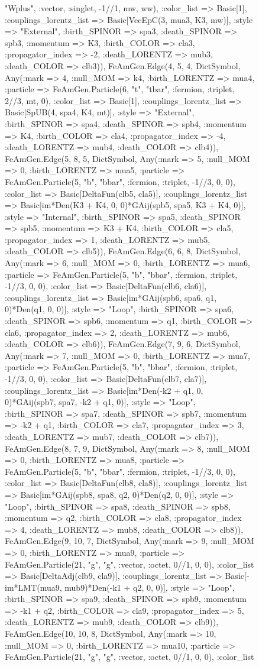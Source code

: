 \documentclass{revtex4}
\begin{document}
\begin{figure}[!htb]
\begin{center}
{"Wplus", :vector, :singlet, -1//1, mw, ww), :color_list => Basic[1], :couplings_lorentz_list => Basic[VecEpC(3, mua3, K3, mw)], :style => "External", :birth_SPINOR => spa3, :death_SPINOR => spb3, :momentum => K3, :birth_COLOR => cla3, :propagator_index => -2, :death_LORENTZ => mub3, :death_COLOR => clb3)), FeAmGen.Edge(4, 5, 4, Dict{Symbol, Any}(:mark => 4, :null_MOM => k4, :birth_LORENTZ => mua4, :particle => FeAmGen.Particle(6, "t", "tbar", :fermion, :triplet, 2//3, mt, 0), :color_list => Basic[1], :couplings_lorentz_list => Basic[SpUB(4, spa4, K4, mt)], :style => "External", :birth_SPINOR => spa4, :death_SPINOR => spb4, :momentum => K4, :birth_COLOR => cla4, :propagator_index => -4, :death_LORENTZ => mub4, :death_COLOR => clb4)), FeAmGen.Edge(5, 8, 5, Dict{Symbol, Any}(:mark => 5, :null_MOM => 0, :birth_LORENTZ => mua5, :particle => FeAmGen.Particle(5, "b", "bbar", :fermion, :triplet, -1//3, 0, 0), :color_list => Basic[DeltaFun(clb5, cla5)], :couplings_lorentz_list => Basic[im*Den(K3 + K4, 0, 0)*GAij(spb5, spa5, K3 + K4, 0)], :style => "Internal", :birth_SPINOR => spa5, :death_SPINOR => spb5, :momentum => K3 + K4, :birth_COLOR => cla5, :propagator_index => 1, :death_LORENTZ => mub5, :death_COLOR => clb5)), FeAmGen.Edge(6, 6, 8, Dict{Symbol, Any}(:mark => 6, :null_MOM => 0, :birth_LORENTZ => mua6, :particle => FeAmGen.Particle(5, "b", "bbar", :fermion, :triplet, -1//3, 0, 0), :color_list => Basic[DeltaFun(clb6, cla6)], :couplings_lorentz_list => Basic[im*GAij(spb6, spa6, q1, 0)*Den(q1, 0, 0)], :style => "Loop", :birth_SPINOR => spa6, :death_SPINOR => spb6, :momentum => q1, :birth_COLOR => cla6, :propagator_index => 2, :death_LORENTZ => mub6, :death_COLOR => clb6)), FeAmGen.Edge(7, 9, 6, Dict{Symbol, Any}(:mark => 7, :null_MOM => 0, :birth_LORENTZ => mua7, :particle => FeAmGen.Particle(5, "b", "bbar", :fermion, :triplet, -1//3, 0, 0), :color_list => Basic[DeltaFun(clb7, cla7)], :couplings_lorentz_list => Basic[im*Den(-k2 + q1, 0, 0)*GAij(spb7, spa7, -k2 + q1, 0)], :style => "Loop", :birth_SPINOR => spa7, :death_SPINOR => spb7, :momentum => -k2 + q1, :birth_COLOR => cla7, :propagator_index => 3, :death_LORENTZ => mub7, :death_COLOR => clb7)), FeAmGen.Edge(8, 7, 9, Dict{Symbol, Any}(:mark => 8, :null_MOM => 0, :birth_LORENTZ => mua8, :particle => FeAmGen.Particle(5, "b", "bbar", :fermion, :triplet, -1//3, 0, 0), :color_list => Basic[DeltaFun(clb8, cla8)], :couplings_lorentz_list => Basic[im*GAij(spb8, spa8, q2, 0)*Den(q2, 0, 0)], :style => "Loop", :birth_SPINOR => spa8, :death_SPINOR => spb8, :momentum => q2, :birth_COLOR => cla8, :propagator_index => 4, :death_LORENTZ => mub8, :death_COLOR => clb8)), FeAmGen.Edge(9, 10, 7, Dict{Symbol, Any}(:mark => 9, :null_MOM => 0, :birth_LORENTZ => mua9, :particle => FeAmGen.Particle(21, "g", "g", :vector, :octet, 0//1, 0, 0), :color_list => Basic[DeltaAdj(clb9, cla9)], :couplings_lorentz_list => Basic[-im*LMT(mua9, mub9)*Den(-k1 + q2, 0, 0)], :style => "Loop", :birth_SPINOR => spa9, :death_SPINOR => spb9, :momentum => -k1 + q2, :birth_COLOR => cla9, :propagator_index => 5, :death_LORENTZ => mub9, :death_COLOR => clb9)), FeAmGen.Edge(10, 10, 8, Dict{Symbol, Any}(:mark => 10, :null_MOM => 0, :birth_LORENTZ => mua10, :particle => FeAmGen.Particle(21, "g", "g", :vector, :octet, 0//1, 0, 0), :color_list }
\end{center}
\end{figure}
\end{document}
